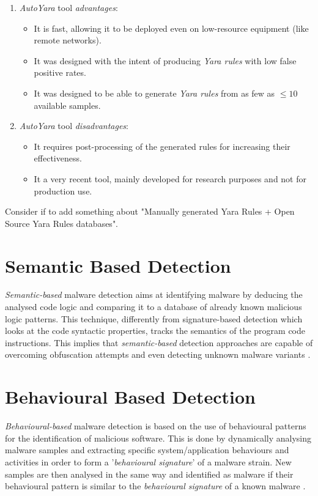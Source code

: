 \documentclass[pdfa%
,cucitura%
]{toptesi}
\begin{document}
\begin{enumerate}
	\item \textit{AutoYara} tool \textit{advantages}:
	\begin{itemize}
		\item It is fast, allowing it to be deployed even on low-resource equipment (like remote networks).
		
		\item It was designed with the intent of producing \textit{Yara rules} with low false positive rates.
		
		\item It was designed to be able to generate \textit{Yara rules} from as few as $\leq10$ available samples.
	\end{itemize}
	
	\item \textit{AutoYara} tool \textit{disadvantages}:
	\begin{itemize}
		\item It requires post-processing of the generated rules for increasing their effectiveness.
		
		\item It a very recent tool, mainly developed for research purposes and not for production use.
	\end{itemize}
\end{enumerate}

\color{Green}
Consider if to add something about "Manually generated Yara Rules + Open Source Yara Rules databases".
\color{Black}

\section{Semantic Based Detection}
\textit{Semantic-based} malware detection aims at identifying malware by deducing the analysed code logic and comparing it to a database of already known malicious logic patterns. This technique, differently from signature-based detection which looks at the code syntactic properties, tracks the semantics of the program code instructions. This implies that \textit{semantic-based} detection approaches are capable of overcoming obfuscation attempts and even detecting unknown malware variants \cite{NamanyaTWM}.

\section{Behavioural Based Detection}
\textit{Behavioural-based} malware detection is based on the use of behavioural patterns for the identification of malicious software. This is done by dynamically analysing malware samples and extracting specific system/application behaviours and activities in order to form a '\textit{behavioural signature}' of a malware strain. New samples are then analysed in the same way and identified as malware if their behavioural pattern is similar to the \textit{behavioural signature} of a known malware \cite{NamanyaTWM}.
\end{document}
